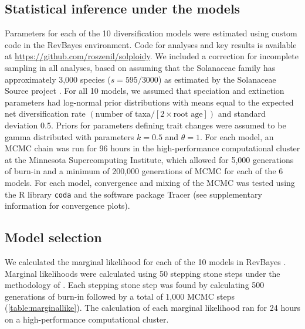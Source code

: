 \subsection{Statistical inference under the models}

Parameters for each of the 10 diversification models were estimated using custom code in the RevBayes \citep{hoehna_2016} environment.
Code for analyses and key results is available at \url{https://github.com/roszenil/solploidy}.
We included a correction for incomplete sampling in all analyses, based on assuming that the Solanaceae family has approximately 3,000 species ($s=595/3000$) as estimated by the Solanaceae Source project \citep{solsource}.
For all 10 models, we assumed that speciation and extinction parameters had log-normal prior distributions with means equal to the expected net diversification rate $(\text{number of taxa} / [2 \times \text{root age}])$ and standard deviation $0.5$.
Priors for parameters defining trait changes were assumed to be gamma distributed with parameters $k=0.5$ and $\theta=1$. 
For each model, an MCMC chain was run for 96 hours in the high-performance computational cluster at the Minnesota Supercomputing Institute, which allowed for 5,000 generations of burn-in and a minimum of 200,000 generations of MCMC for each of the 6 models. %
For each model, convergence and mixing of the MCMC was tested using the R library \texttt{coda} and the software package Tracer (see supplementary information for convergence plots). %


\subsection{Model selection}

We calculated the marginal likelihood for each of the 10 models in RevBayes \citep{hoehna_2016}.
Marginal likelihoods were calculated using 50 stepping stone steps under the methodology of \citet{xie_2010}.
Each stepping stone step was found by calculating 500 generations of burn-in followed by a total of 1,000 MCMC steps (\cref{table:marginallike}).
The calculation of each marginal likelihood ran for 24 hours on a high-performance computational cluster.

